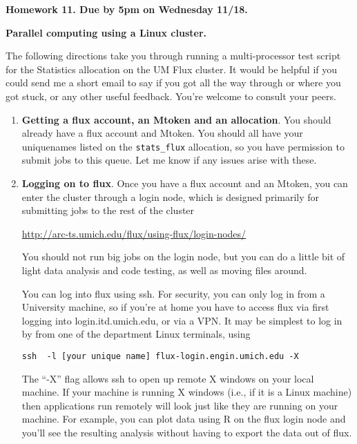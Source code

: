 \documentclass[12pt]{article}
\begin{document}
\begin{center}\bf
Homework 11. Due by 5pm on Wednesday 11/18.

{\bf Parallel computing using a Linux cluster.}

\end{center}

The following directions take you through running a multi-processor test script for the Statistics allocation on the UM Flux cluster. It would be helpful if you could send me a short email to say if you got all the way through or where you got stuck, or any other useful feedback. You're welcome to consult your peers. 

\begin{enumerate}

\item {\bf Getting a flux account, an Mtoken and an allocation}. You should already have a flux account and Mtoken. You should all have your uniquenames listed on the \texttt{stats\_flux} allocation, so you have permission to submit jobs to this queue. Let me know if any issues arise with these.

\item {\bf Logging on to flux}. Once you have a flux account and an Mtoken, you can enter the cluster through a login node, which is designed primarily for submitting jobs to the rest of the cluster 

\url{http://arc-ts.umich.edu/flux/using-flux/login-nodes/}

You should not run big jobs on the login node, but you can do a little bit of light data analysis and code testing, as well as moving files around.

You can log into flux using ssh.
For security, you can only log in from a University machine, so if you're at home you have to access flux via first logging into login.itd.umich.edu, or via a VPN. It may be simplest to log in by from one of the department Linux terminals, using
\begin{verbatim}
ssh  -l [your unique name] flux-login.engin.umich.edu -X
\end{verbatim}
The ``-X'' flag allows ssh to open up remote X windows on your local machine. If your machine is running X windows (i.e., if it is a Linux machine) then applications run remotely will look just like they are running on your machine. For example, you can plot data using R on the flux login node and you'll see the resulting analysis without having to export the data out of flux. 


\end{enumerate}
\end{document}
